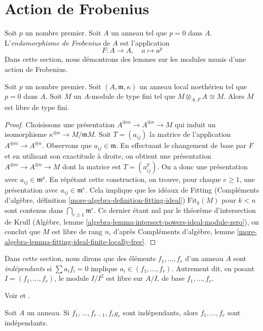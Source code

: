 \section{Action de Frobenius}
\label{section-frobenius}

\noindent
Soit $p$ un nombre premier. Soit $A$ un anneau tel que $p = 0$ dans $A$. L'{\it endomorphisme de Frobenius} de $A$ est l'application
$$
F : A \longrightarrow A,
\quad
a \longmapsto a^p
$$
Dans cette section, nous démontrons des lemmes sur les modules munis d'une action de Frobenius.

\begin{lemma}
\label{lemma-annihilator-frobenius-module}
Soit $p$ un nombre premier. Soit $(A, \mathfrak m, \kappa)$ un anneau local noethérien tel que $p = 0$ dans $A$. Soit $M$ un $A$-module de type fini tel que $M \otimes_{A, F} A \cong M$. Alors $M$ est libre de type fini.
\end{lemma}

\begin{proof}
Choisissons une présentation $A^{\oplus m} \to A^{\oplus n} \to M$ qui induit un isomorphisme $\kappa^{\oplus n} \to M/\mathfrak m M$. Soit $T = (a_{ij})$ la matrice de l'application $A^{\oplus m} \to A^{\oplus n}$. Observons que $a_{ij} \in \mathfrak m$. En effectuant le changement de base par $F$ et en utilisant son exactitude à droite, on obtient une présentation $A^{\oplus m} \to A^{\oplus n} \to M$ dont la matrice est $T = (a_{ij}^p)$. On a donc une présentation avec $a_{ij} \in \mathfrak m^p$. En répétant cette construction, on trouve, pour chaque $e \geq 1$, une présentation avec $a_{ij} \in \mathfrak m^e$. Cela implique que les idéaux de Fitting (Compléments d'algèbre, définition \ref{more-algebra-definition-fitting-ideal}) $\text{Fit}_k(M)$ pour $k < n$ sont contenus dans $\bigcap_{e \geq 1} \mathfrak m^e$. Ce dernier étant nul par le théorème d'intersection de Krull (Algèbre, lemme \ref{algebra-lemma-intersect-powers-ideal-module-zero}), on conclut que $M$ est libre de rang $n$, d'après Compléments d'algèbre, lemme \ref{more-algebra-lemma-fitting-ideal-finite-locally-free}.
\end{proof}

\noindent
Dans cette section, nous dirons que des éléments $f_1, \ldots, f_r$ d'un anneau $A$ sont {\it indépendants} si $\sum a_if_i = 0$ implique $a_i \in (f_1, \ldots, f_r)$. Autrement dit, en posant $I = (f_1, \ldots, f_r)$, le module $I/I^2$ est libre sur $A/I$, de base $f_1, \ldots, f_r$.

\begin{lemma}
\label{lemma-1}
\begin{reference}
Voir \cite{Lech-inequalities} et \cite[Lemma 1 page 299]{MatCA}.
\end{reference}
Soit $A$ un anneau. Si $f_1, \ldots, f_{r - 1}, f_rg_r$ sont indépendants, alors $f_1, \ldots, f_r$ sont indépendants.
\end{lemma}

